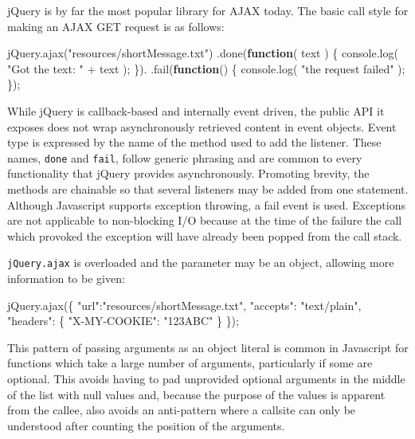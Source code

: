 \documentclass[]{article}
\newenvironment{Shaded}{}{}
\newcommand{\KeywordTok}[1]{\textcolor[rgb]{0.00,0.44,0.13}{\textbf{{#1}}}}
\newcommand{\StringTok}[1]{\textcolor[rgb]{0.25,0.44,0.63}{{#1}}}
\newcommand{\OtherTok}[1]{\textcolor[rgb]{0.00,0.44,0.13}{{#1}}}
\newcommand{\FunctionTok}[1]{\textcolor[rgb]{0.02,0.16,0.49}{{#1}}}
\newcommand{\NormalTok}[1]{{#1}}
\begin{document}
jQuery is by far the most popular library for AJAX today. The basic call
style for making an AJAX GET request is as follows:

\begin{Shaded}
\begin{Highlighting}[]
\OtherTok{jQuery}\NormalTok{.}\FunctionTok{ajax}\NormalTok{(}\StringTok{"resources/shortMessage.txt"}\NormalTok{)}
   \NormalTok{.}\FunctionTok{done}\NormalTok{(}\KeywordTok{function}\NormalTok{( text ) \{}
      \OtherTok{console}\NormalTok{.}\FunctionTok{log}\NormalTok{( }\StringTok{"Got the text: "} \NormalTok{+ text ); }
   \NormalTok{\}).}
   \NormalTok{.}\FunctionTok{fail}\NormalTok{(}\KeywordTok{function}\NormalTok{() \{}
      \OtherTok{console}\NormalTok{.}\FunctionTok{log}\NormalTok{( }\StringTok{"the request failed"} \NormalTok{);      }
   \NormalTok{\});}
\end{Highlighting}
\end{Shaded}

While jQuery is callback-based and internally event driven, the public
API it exposes does not wrap asynchronously retrieved content in event
objects. Event type is expressed by the name of the method used to add
the listener. These names, \texttt{done} and \texttt{fail}, follow
generic phrasing and are common to every functionality that jQuery
provides asynchronously. Promoting brevity, the methods are chainable so
that several listeners may be added from one statement. Although
Javascript supports exception throwing, a fail event is used. Exceptions
are not applicable to non-blocking I/O because at the time of the
failure the call which provoked the exception will have already been
popped from the call stack.

\texttt{jQuery.ajax} is overloaded and the parameter may be an object,
allowing more information to be given:

\begin{Shaded}
\begin{Highlighting}[]
\OtherTok{jQuery}\NormalTok{.}\FunctionTok{ajax}\NormalTok{(\{ }\StringTok{"url"}\NormalTok{:}\StringTok{"resources/shortMessage.txt"}\NormalTok{,}
              \StringTok{"accepts"}\NormalTok{: }\StringTok{"text/plain"}\NormalTok{,}
              \StringTok{"headers"}\NormalTok{: \{ }\StringTok{"X-MY-COOKIE"}\NormalTok{: }\StringTok{"123ABC"} \NormalTok{\}}
           \NormalTok{\});}
\end{Highlighting}
\end{Shaded}

This pattern of passing arguments as an object literal is common in
Javascript for functions which take a large number of arguments,
particularly if some are optional. This avoids having to pad unprovided
optional arguments in the middle of the list with null values and,
because the purpose of the values is apparent from the callee, also
avoids an anti-pattern where a callsite can only be understood after
counting the position of the arguments.
\end{document}
